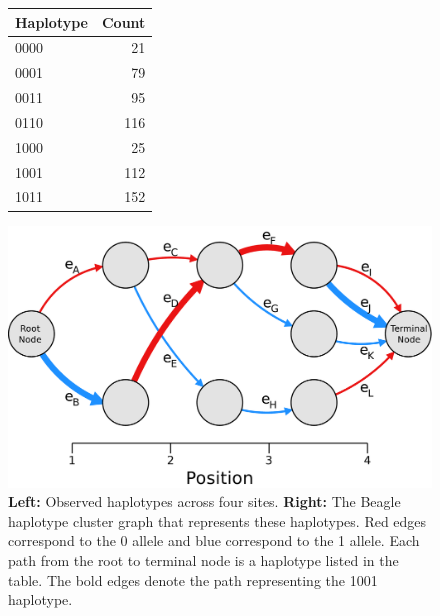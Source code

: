 \begin{figure}

  \begin{minipage}[t]{0.25\textwidth}
    \vspace{30pt}
    \begin{tabular}{lr}
      \hline
      Haplotype & Count \\
      \hline
      0000&	21\\
      0001&	79\\
      0011&	95\\
      0110&	116\\
      1000&	25\\
      1001&	112\\
      1011&	152\\
      \hline
    \end{tabular}
  \end{minipage}
  \hfill
  \begin{minipage}[t]{0.7\textwidth}
    \vspace{0pt}
    \includegraphics[width=\textwidth]{chap3figs/beagle}
  \end{minipage}
  \caption[The Beagle haplotype model]{\textbf{Left:} Observed haplotypes across four sites. \textbf{Right:} The Beagle haplotype cluster graph that represents these haplotypes. Red edges correspond to the 0 allele and blue correspond to the 1 allele. Each path from the root to terminal node is a haplotype listed in the table. The bold edges denote the path representing the 1001 haplotype.\label{chap3:beaglefig}}
\end{figure}


